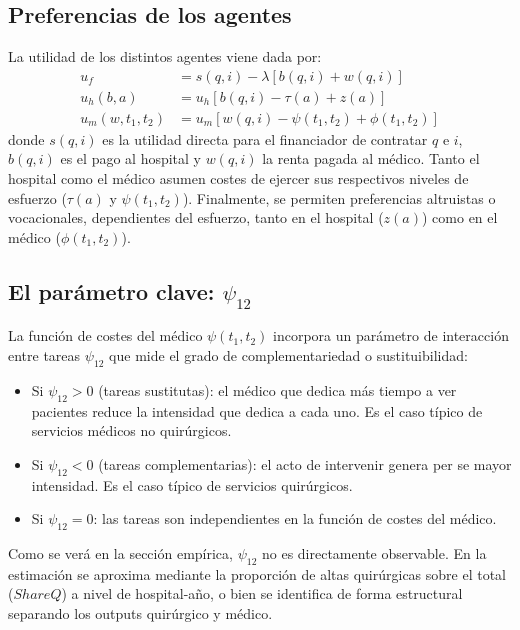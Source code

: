 \documentclass[12pt, a4paper, twoside, openright]{book}
\theoremstyle{plain}
\theoremstyle{definition}
\theoremstyle{remark}
\begin{document}
\subsection{Preferencias de los agentes}

La utilidad de los distintos agentes viene dada por:
\begin{align}
    u_f &= s(q,i)-\lambda[b(q,i)+w(q,i)] \label{eq:util_f}\\
    u_h(b,a) &= u_h[b(q,i)-\tau(a)+z(a)] \label{eq:util_h}\\
    u_m(w,t_1,t_2) &= u_m[w(q,i)-\psi(t_1,t_2)+\phi(t_1,t_2)] \label{eq:util_m}
\end{align}
donde $s(q,i)$ es la utilidad directa para el financiador de contratar $q$ e $i$, $b(q,i)$ es el pago al hospital y $w(q,i)$ la renta pagada al médico. Tanto el hospital como el médico asumen costes de ejercer sus respectivos niveles de esfuerzo ($\tau(a)$ y $\psi(t_1,t_2)$). Finalmente, se permiten preferencias altruistas o vocacionales, dependientes del esfuerzo, tanto en el hospital ($z(a)$) como en el médico ($\phi(t_1,t_2)$).

\subsection{El parámetro clave: \texorpdfstring{$\psi_{12}$}{psi\_12}}

La función de costes del médico $\psi(t_1,t_2)$ incorpora un parámetro de interacción entre tareas $\psi_{12}$ que mide el grado de complementariedad o sustituibilidad:
\begin{itemize}[leftmargin=2cm]
  \item Si $\psi_{12} > 0$ (tareas sustitutas): el médico que dedica más tiempo a ver pacientes reduce la intensidad que dedica a cada uno. Es el caso típico de servicios médicos no quirúrgicos.
  \item Si $\psi_{12} < 0$ (tareas complementarias): el acto de intervenir genera per se mayor intensidad. Es el caso típico de servicios quirúrgicos.
  \item Si $\psi_{12} = 0$: las tareas son independientes en la función de costes del médico.
\end{itemize}

Como se verá en la sección empírica, $\psi_{12}$ no es directamente observable. En la estimación se aproxima mediante la proporción de altas quirúrgicas sobre el total ($ShareQ$) a nivel de hospital-año, o bien se identifica de forma estructural separando los outputs quirúrgico y médico.
\end{document}
